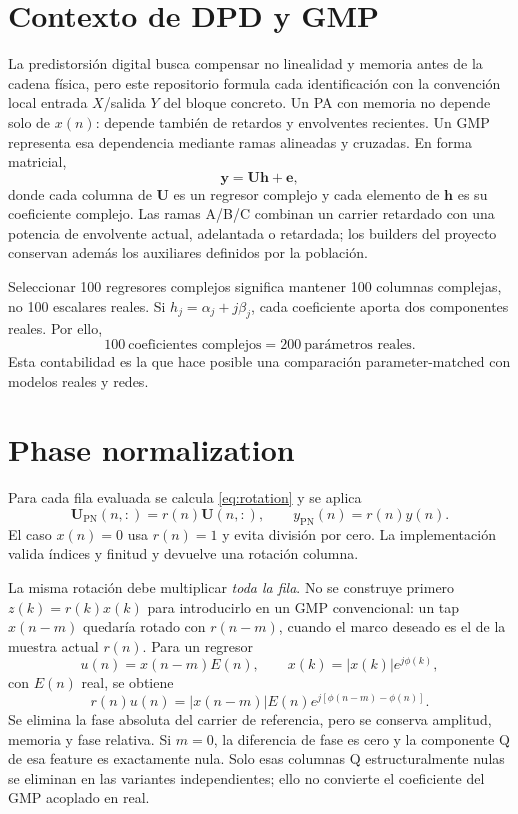 \documentclass[10pt,a4paper]{article}
\begin{document}
\section{Contexto de DPD y GMP}

La predistorsión digital busca compensar no linealidad y memoria antes de la
cadena física, pero este repositorio formula cada identificación con la
convención local entrada $X$/salida $Y$ del bloque concreto. Un PA con memoria no
depende solo de $x(n)$: depende también de retardos y envolventes recientes. Un
GMP representa esa dependencia mediante ramas alineadas y cruzadas. En forma
matricial,
\begin{equation}
 \mathbf y=\mathbf U\mathbf h+\mathbf e,
\end{equation}
donde cada columna de $\mathbf U$ es un regresor complejo y cada elemento de
$\mathbf h$ es su coeficiente complejo. Las ramas A/B/C combinan un carrier
retardado con una potencia de envolvente actual, adelantada o retardada; los
builders del proyecto conservan además los auxiliares definidos por la población.

Seleccionar 100 regresores complejos significa mantener 100 columnas complejas,
no 100 escalares reales. Si $h_j=\alpha_j+j\beta_j$, cada coeficiente aporta dos
componentes reales. Por ello,
\begin{equation}
 100\ \text{coeficientes complejos}=200\ \text{parámetros reales}.
\end{equation}
Esta contabilidad es la que hace posible una comparación parameter-matched con
modelos reales y redes.

\section{Phase normalization}

Para cada fila evaluada se calcula \eqref{eq:rotation} y se aplica
\begin{equation}
 \mathbf U_{\mathrm{PN}}(n,:)=r(n)\mathbf U(n,:),\qquad
 y_{\mathrm{PN}}(n)=r(n)y(n).
 \label{eq:pnrow}
\end{equation}
El caso $x(n)=0$ usa $r(n)=1$ y evita división por cero. La implementación valida
índices y finitud y devuelve una rotación columna.

La misma rotación debe multiplicar \emph{toda la fila}. No se construye primero
$z(k)=r(k)x(k)$ para introducirlo en un GMP convencional: un tap $x(n-m)$ quedaría
rotado con $r(n-m)$, cuando el marco deseado es el de la muestra actual $r(n)$.
Para un regresor
\begin{equation}
 u(n)=x(n-m)E(n),\qquad x(k)=|x(k)|e^{j\phi(k)},
\end{equation}
con $E(n)$ real, se obtiene
\begin{equation}
 r(n)u(n)=|x(n-m)|E(n)e^{j[\phi(n-m)-\phi(n)]}.
 \label{eq:relativephase}
\end{equation}
Se elimina la fase absoluta del carrier de referencia, pero se conserva amplitud,
memoria y fase relativa. Si $m=0$, la diferencia de fase es cero y la componente
Q de esa feature es exactamente nula. Solo esas columnas Q estructuralmente
nulas se eliminan en las variantes independientes; ello no convierte el
coeficiente del GMP acoplado en real.
\end{document}

